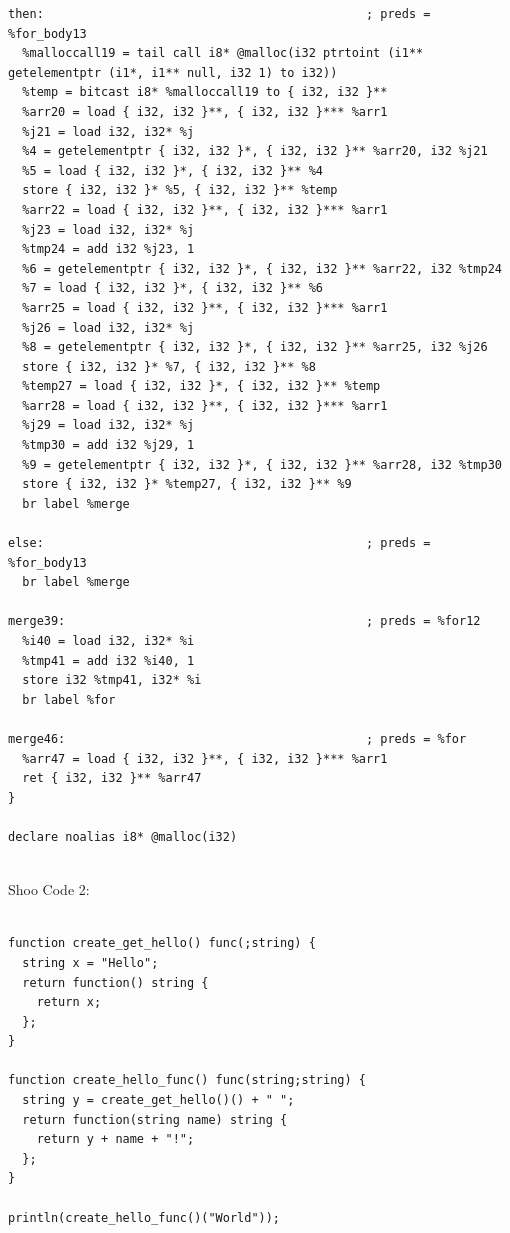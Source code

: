\documentclass[12pt]{article}
\begin{document}
\begin{mdframed}[hidealllines=true,backgroundcolor=green!10]
\begin{lstlisting}
then:                                             ; preds = %for_body13
  %malloccall19 = tail call i8* @malloc(i32 ptrtoint (i1** getelementptr (i1*, i1** null, i32 1) to i32))
  %temp = bitcast i8* %malloccall19 to { i32, i32 }**
  %arr20 = load { i32, i32 }**, { i32, i32 }*** %arr1
  %j21 = load i32, i32* %j
  %4 = getelementptr { i32, i32 }*, { i32, i32 }** %arr20, i32 %j21
  %5 = load { i32, i32 }*, { i32, i32 }** %4
  store { i32, i32 }* %5, { i32, i32 }** %temp
  %arr22 = load { i32, i32 }**, { i32, i32 }*** %arr1
  %j23 = load i32, i32* %j
  %tmp24 = add i32 %j23, 1
  %6 = getelementptr { i32, i32 }*, { i32, i32 }** %arr22, i32 %tmp24
  %7 = load { i32, i32 }*, { i32, i32 }** %6
  %arr25 = load { i32, i32 }**, { i32, i32 }*** %arr1
  %j26 = load i32, i32* %j
  %8 = getelementptr { i32, i32 }*, { i32, i32 }** %arr25, i32 %j26
  store { i32, i32 }* %7, { i32, i32 }** %8
  %temp27 = load { i32, i32 }*, { i32, i32 }** %temp
  %arr28 = load { i32, i32 }**, { i32, i32 }*** %arr1
  %j29 = load i32, i32* %j
  %tmp30 = add i32 %j29, 1
  %9 = getelementptr { i32, i32 }*, { i32, i32 }** %arr28, i32 %tmp30
  store { i32, i32 }* %temp27, { i32, i32 }** %9
  br label %merge

else:                                             ; preds = %for_body13
  br label %merge

merge39:                                          ; preds = %for12
  %i40 = load i32, i32* %i
  %tmp41 = add i32 %i40, 1
  store i32 %tmp41, i32* %i
  br label %for

merge46:                                          ; preds = %for
  %arr47 = load { i32, i32 }**, { i32, i32 }*** %arr1
  ret { i32, i32 }** %arr47
}

declare noalias i8* @malloc(i32)
\end{lstlisting}
\end{mdframed}
\\
Shoo Code 2:\\
\\
\begin{mdframed}[hidealllines=true,backgroundcolor=blue!10]
\begin{lstlisting}
function create_get_hello() func(;string) {
  string x = "Hello";
  return function() string {
    return x;
  };
}

function create_hello_func() func(string;string) {
  string y = create_get_hello()() + " ";
  return function(string name) string {
    return y + name + "!";
  };
}

println(create_hello_func()("World"));
\end{lstlisting}
\end{mdframed}
\end{document}
